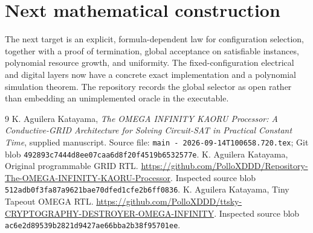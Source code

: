 \documentclass[11pt]{article}
\begin{document}
\section{Next mathematical construction}
The next target is an explicit, formula-dependent law for configuration
selection, together with a proof of termination, global acceptance on
satisfiable instances, polynomial resource growth, and uniformity.
The fixed-configuration electrical and digital layers now have a
concrete exact implementation and a polynomial simulation theorem.
The repository records the global selector as open rather than
embedding an unimplemented oracle in the executable.

\begin{thebibliography}{9}
K. Aguilera Katayama,
\emph{The OMEGA INFINITY KAORU Processor: A Conductive-GRID Architecture
for Solving Circuit-SAT in Practical Constant Time}, supplied manuscript.
Source file: \texttt{main - 2026-09-14T100658.720.tex};
Git blob \texttt{492893c7444d8ee07caa6d8f20f4519b6532577e}.
K. Aguilera Katayama, Original programmable GRID RTL.
\url{https://github.com/PolloXDDD/Repository-The-OMEGA-INFINITY-KAORU-Processor}.
Inspected source blob \texttt{512adb0f3fa87a9621bae70dfed1cfe2b6ff0836}.
K. Aguilera Katayama, Tiny Tapeout OMEGA RTL.
\url{https://github.com/PolloXDDD/ttsky-CRYPTOGRAPHY-DESTROYER-OMEGA-INFINITY}.
Inspected source blob \texttt{ac6e2d89539b2821d9427ae66bba2b38f95701ee}.
\end{thebibliography}
\end{document}
